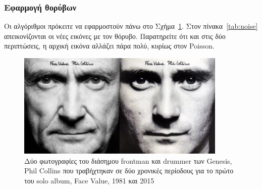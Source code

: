 \subsubsection{Εφαρμογή θορύβων}

Οι αλγόριθμοι πρόκειτε να εφαρμοστούν πάνω στο Σχήμα~\ref{fig:collins}. 
Στον πίνακα~\ref{tab:noise} απεικονίζονται οι νέες εικόνες με τον θόρυβο.
Παρατηρείτε ότι και στις δύο περιπτώσεις, η αρχική εικόνα αλλάζει πάρα πολύ, κυρίως στον Poisson.

\begin{figure}[th]
	\centering
	\includegraphics[width=100mm]{Figures/face_value}
	\caption[Phil Collins - Face Value]{Δύο φωτογραφίες του διάσημου frontman και drummer των Genesis, Phil Collins που τραβήχτηκαν σε δύο χρονικές περίοδους για το πρώτο του solo album, Face Value, 1981 και 2015}
	\label{fig:collins}
\end{figure}

